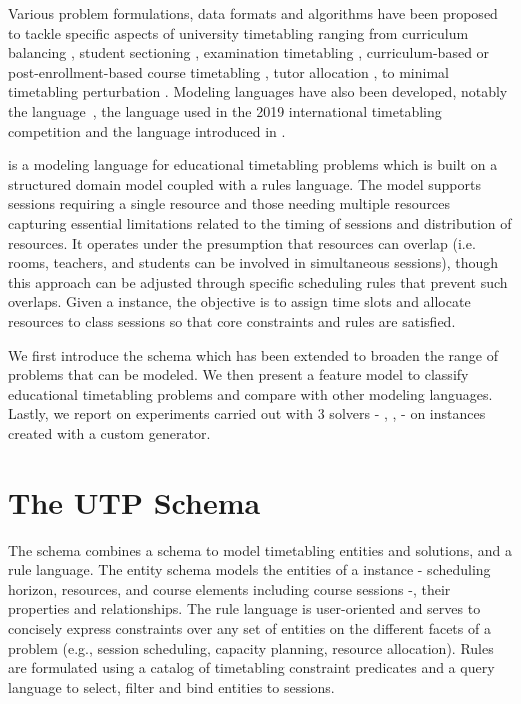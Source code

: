\documentclass[runningheads]{llncs}
\begin{document}
Various problem formulations, data formats and algorithms have been proposed to tackle specific aspects of university timetabling 
ranging from curriculum balancing \cite{2001_castro_ARXIV,2012_chiarandini_JH,2013_rubio_MPE}, student sectioning \cite{2010_muller_AOR,2019_schindl_AOR}, examination timetabling \cite{1996_carter_JORS,2020_battistutta_CPAIOR,2010_mccollum_INFORMS}, curriculum-based or post-enrollment-based course timetabling \cite{2010_mccollum_INFORMS,2015_bettinelli_TOP,2007_lewis_ITC,2012_cambazard_AOR,2017_goh_EJOR,2021_chen_IEEEA}, tutor allocation \cite{2022_caselli_ESWA}, to minimal timetabling perturbation \cite{2019_lindahl_EJOR,2020_lemos_JS}. 
Modeling languages have also been developed, notably the {\XHSTT} language~\cite{2012_ahmadi_AOR}, the {\ITC} language used in the 2019 international timetabling competition \cite{2018_muller_PATAT,2019_ITC} and the {\UTP} language introduced in \cite{2022_barichard_PATAT}.


{\UTP} is a modeling language for educational timetabling problems
which is built on a structured domain model coupled with a rules language.
The model supports sessions requiring a single resource 
and those needing multiple resources 
capturing essential limitations related to the timing of sessions and distribution of resources. 
It operates under the presumption that resources can overlap (i.e. rooms, teachers, and students can be involved in simultaneous sessions), though this approach can be adjusted through specific scheduling rules that prevent such overlaps. 
Given a \UTP{} instance, the objective is to assign time slots and allocate resources to class sessions so that core constraints and rules are satisfied.


We first introduce the {\UTP} schema which has been extended to broaden the range of problems that can be modeled. 
We then present a feature model to classify educational timetabling problems and compare \UTP{} with other modeling languages. 
Lastly, we report on experiments carried out with 3 \UTP{} solvers - {\CP}, {\ASP}, {\MIP} -
on instances created with a custom generator. 



 \section{The UTP Schema}
\label{sec:schema}
The \UTP{} schema combines a schema to model timetabling entities and solutions, 
and a rule language.
The entity schema models the entities of a \UTP{} instance
- scheduling horizon, resources, and course elements including course sessions -,
their properties and relationships.
The rule language is user-oriented
and serves to concisely express constraints
over any set of entities
on the different facets of a problem (e.g., session scheduling, capacity planning, resource allocation).
Rules are formulated
using a catalog of timetabling constraint predicates
and a query language to select, filter and bind entities to sessions. 
 
\end{document}
